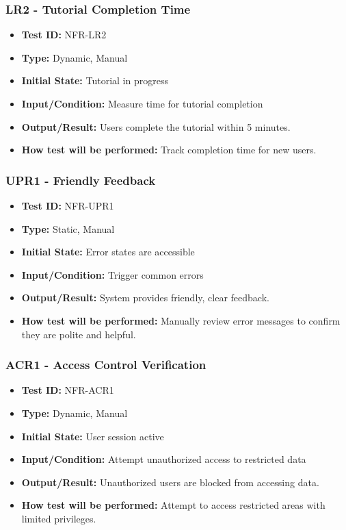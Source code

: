 \documentclass[12pt, titlepage]{article}
\begin{document}
\subsubsection{LR2 - Tutorial Completion Time}
\begin{itemize}
    \item \textbf{Test ID:} NFR-LR2
    \item \textbf{Type:} Dynamic, Manual
    \item \textbf{Initial State:} Tutorial in progress
    \item \textbf{Input/Condition:} Measure time for tutorial completion
    \item \textbf{Output/Result:} Users complete the tutorial within 5 minutes.
    \item \textbf{How test will be performed:} Track completion time for new users.
\end{itemize}

\subsubsection{UPR1 - Friendly Feedback}
\begin{itemize}
    \item \textbf{Test ID:} NFR-UPR1
    \item \textbf{Type:} Static, Manual
    \item \textbf{Initial State:} Error states are accessible
    \item \textbf{Input/Condition:} Trigger common errors
    \item \textbf{Output/Result:} System provides friendly, clear feedback.
    \item \textbf{How test will be performed:} Manually review error messages to confirm they are polite and helpful.
\end{itemize}

\subsubsection{ACR1 - Access Control Verification}
\begin{itemize}
    \item \textbf{Test ID:} NFR-ACR1
    \item \textbf{Type:} Dynamic, Manual
    \item \textbf{Initial State:} User session active
    \item \textbf{Input/Condition:} Attempt unauthorized access to restricted data
    \item \textbf{Output/Result:} Unauthorized users are blocked from accessing data.
    \item \textbf{How test will be performed:} Attempt to access restricted areas with limited privileges.
\end{itemize}
\end{document}

